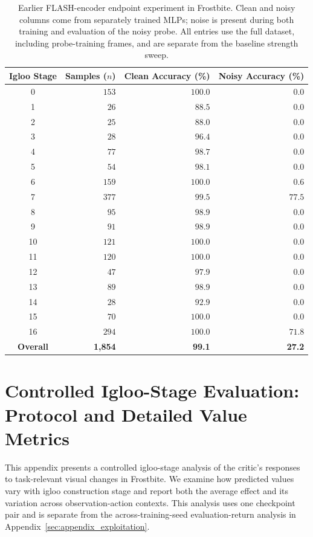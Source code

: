 \documentclass{article} %
\begin{document}
\begin{table}[H]
    \centering
    \caption{Earlier FLASH-encoder endpoint experiment in Frostbite. Clean and noisy columns come from separately trained MLPs; noise is present during both training and evaluation of the noisy probe. All entries use the full dataset, including probe-training frames, and are separate from the baseline strength sweep.}
    \label{tab:per_class_noise_flash}
    \begin{tabular}{crrr}
        \toprule
        \textbf{Igloo Stage} & \textbf{Samples ($n$)} & \textbf{Clean Accuracy (\%)} & \textbf{Noisy Accuracy (\%)} \\
        \midrule
        0 & $153$ & $100.0$ & $0.0$ \\
        1 & $26$ & $88.5$ & $0.0$ \\
        2 & $25$ & $88.0$ & $0.0$ \\
        3 & $28$ & $96.4$ & $0.0$ \\
        4 & $77$ & $98.7$ & $0.0$ \\
        5 & $54$ & $98.1$ & $0.0$ \\
        6 & $159$ & $100.0$ & $0.6$ \\
        7 & $377$ & $99.5$ & $77.5$ \\
        8 & $95$ & $98.9$ & $0.0$ \\
        9 & $91$ & $98.9$ & $0.0$ \\
        10 & $121$ & $100.0$ & $0.0$ \\
        11 & $120$ & $100.0$ & $0.0$ \\
        12 & $47$ & $97.9$ & $0.0$ \\
        13 & $89$ & $98.9$ & $0.0$ \\
        14 & $28$ & $92.9$ & $0.0$ \\
        15 & $70$ & $100.0$ & $0.0$ \\
        16 & $294$ & $100.0$ & $71.8$ \\
        \midrule
        \textbf{Overall} & \textbf{1,854} & \textbf{99.1} & \textbf{27.2} \\
        \bottomrule
    \end{tabular}
\end{table}

\onecolumn

\section{Controlled Igloo-Stage Evaluation: Protocol and Detailed Value Metrics}
\label{sec:appendix_value_robustness}
This appendix presents a controlled igloo-stage analysis of the critic's responses to task-relevant visual changes in Frostbite. We examine how predicted values vary with igloo construction stage and report both the average effect and its variation across observation-action contexts. This analysis uses one checkpoint pair and is separate from the across-training-seed evaluation-return analysis in Appendix~\ref{sec:appendix_exploitation}.
\end{document}
